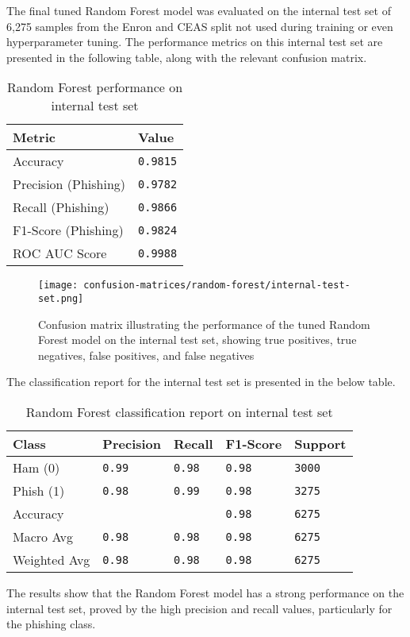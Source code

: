 \noindent The final tuned Random Forest model was evaluated on the internal test set of 6,275 samples from the Enron and CEAS split not used during training or even hyperparameter tuning. The performance metrics on this internal test set are presented in the following table, along with the relevant confusion matrix.

\begin{table}[h]
\centering
\begin{tabularx}{\textwidth}{|X|X|}
\hline
\textbf{Metric} & \textbf{Value} \\
\hline
Accuracy & \texttt{0.9815} \\
\hline
Precision (Phishing) & \texttt{0.9782} \\
\hline
Recall (Phishing) & \texttt{0.9866} \\
\hline
F1-Score (Phishing) & \texttt{0.9824} \\
\hline
ROC AUC Score & \texttt{0.9988} \\
\hline
\end{tabularx}
\caption{Random Forest performance on internal test set}
\end{table}

\begin{figure}[H]
  \begin{center}
    \texttt{[image: confusion-matrices/random-forest/internal-test-set.png]}
    \caption{Confusion matrix illustrating the performance of the tuned Random Forest model on the internal test set, showing true positives, true negatives, false positives, and false negatives}
  \end{center}
\end{figure}

\noindent The classification report for the internal test set is presented in the below table.

\begin{table}[h]
\centering
\begin{tabularx}{\textwidth}{|X|X|X|X|X|}
\hline
\textbf{Class} & \textbf{Precision} & \textbf{Recall} & \textbf{F1-Score} & \textbf{Support} \\
\hline
Ham (0) & \texttt{0.99} & \texttt{0.98} & \texttt{0.98} & \texttt{3000} \\
\hline
Phish (1) & \texttt{0.98} & \texttt{0.99} & \texttt{0.98} & \texttt{3275} \\
\hline
Accuracy & & & \texttt{0.98} & \texttt{6275} \\
\hline
Macro Avg & \texttt{0.98} & \texttt{0.98} & \texttt{0.98} & \texttt{6275} \\
\hline
Weighted Avg & \texttt{0.98} & \texttt{0.98} & \texttt{0.98} & \texttt{6275} \\
\hline
\end{tabularx}
\caption{Random Forest classification report on internal test set}
\end{table}

\noindent The results show that the Random Forest model has a strong performance on the internal test set, proved by the high precision and recall values, particularly for the phishing class.
